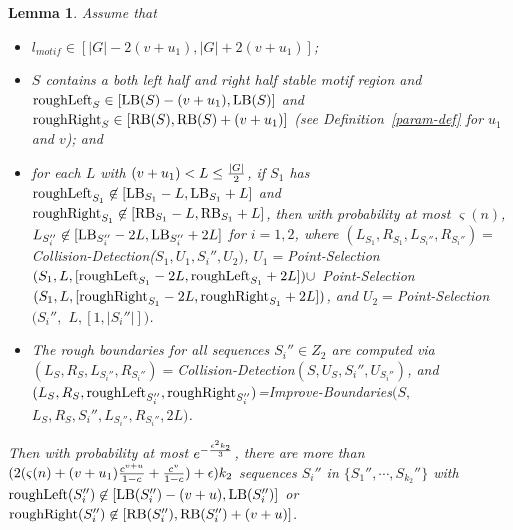 \documentclass[11pt]{article}
\newtheorem{lemmafoo}[theoremfoo]{Lemma}
\newenvironment{lemma}{\pagebreak[1]\begin{lemmafoo}}{\end{lemmafoo}}
\newcommand{\roughright}{{\rm roughRight}}
\newcommand{\LB}{{\rm LB}}
\newcommand{\RB}{{\rm RB}}
\begin{document}
\begin{lemma}\label{left-boundary-detect-lemma}
 Assume that
\begin{itemize}
\item
  $l_{motif}\in [|G|-2(v+u_1), |G|+2(v+u_1)]$;
\item
 $S$ contains a both left half and right half stable motif region and $\roughleft_{S}\in [\LB(S)-(v+u_1),\LB(S)]$
 and $\roughright_{S}\in [\RB(S),\RB(S)+(v+u_1)]$ (see Definition~\ref{param-def} for $u_1$ and
 $v$); and
\item
for each $L$ with $(v+u_1)<L\le {|G|\over 2}$, if $S_1$ has
$\roughleft_{S_1}\not \in [\LB_{S_1}-L, \LB_{S_1}+L]$ and
$\roughright_{S_1}\not \in [\RB_{S_1}-L, \RB_{S_1}+L]$, then
 with probability at most
$\varsigma(n)$, $L_{S_i''}\not \in [\LB_{S_i''}-2L, \LB_{S_i''}+2L]$
for $i=1,2$, where $(L_{S_1}, R_{S_1}, L_{S_i''},
R_{S_i''})=$Collision-Detection($S_1, U_1, S_i'', U_2)$,
$U_1=$Point-Selection$(S_1,L,
[{\rm roughLeft}_{S_1}-2L,{\rm roughLeft}_{S_1}+2L])\cup$
Point-Selection$(S_1,L,
[\roughright_{S_1}-2L,\roughright_{S_1}+2L])$, and
$U_2=$Point-Selection$(S_i'',$ $L, [1,|S_i''|])$.
\item
The rough boundaries for all sequences $S_i''\in Z_2$ are computed
via $(L_{S}, R_{S}, L_{S_i''},R_{S_i''})=$Collision-Detection$(S,
U_{S}, S_i'', U_{S_i''})$, and $(L_{S}, R_{S},
\roughleft_{S_i''},\roughright_{S_i''})$=Improve-Boundaries$(S,$
$L_{S}, R_{S}, S_i'', L_{S_i''}, R_{S_i''}, 2L)$.
\end{itemize}

 Then with probability at most $e^{-{\epsilon^2k_2\over 3}}$, there are
more than $(2(\varsigma(n)+ (v+u_1){c^{v+u}\over 1-c}+{c^{v}\over
1-c})+\epsilon)k_2$ sequences $S_i''$ in $\{S_1'',\cdots,
S_{k_2}''\}$ with $\roughleft(S_i'')\not\in [\LB(S_i'')-(v+u),
\LB(S_i'')]$ or $\roughright(S_i'')\not\in [\RB(S_i''),
\RB(S_i'')+(v+u)]$.
\end{lemma}
\end{document}

